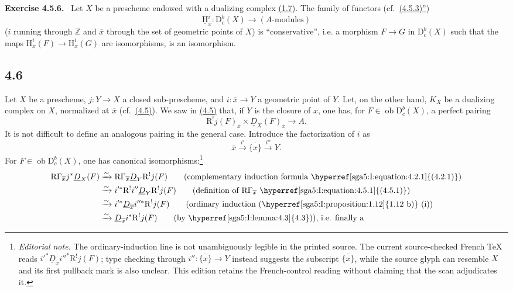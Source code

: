 \documentclass[11pt]{article}
\newenvironment{statement}[1]{\par\medskip\noindent\textbf{#1.}\ }{\par\medskip}
\renewcommand{\H}{\mathrm{H}}
\newcommand{\R}{\mathrm{R}}
\newcommand{\D}{\mathrm{D}}
\newcommand{\Z}{\mathbb{Z}}
\newcommand{\ob}{\operatorname{ob}}
\newcommand{\ol}[1]{\overline{#1}}
\providecommand{\ob}{\operatorname{ob}}
\providecommand{\R}{\mathrm R}
\providecommand{\Z}{\mathbb Z}
\begin{document}
\label{sga5:I:exercise:4.5.6}\begin{statement}{Exercise 4.5.6}
Let $X$ be a prescheme endowed with a dualizing complex \hyperref[sga5:I:definition:1.7]{(1.7)}. The family of functors (cf.~\hyperref[sga5:I:equation:4.5.3:3]{(4.5.3)''})
\[
\underline{\H}_{\ol{x}}^i:\D_c^b(X)\longrightarrow (A\text{-modules})
\]
($i$ running through $\Z$ and $\ol{x}$ through the set of geometric points of $X$) is ``conservative'', i.e. a morphism $F\to G$ in $\D_c^b(X)$ such that the maps $\H_{\ol{x}}^i(F)\to\H_{\ol{x}}^i(G)$ are isomorphisms, is an isomorphism.
\end{statement}

\subsection*{4.6}\label{sga5:I:subsection:4.6}
Let $X$ be a prescheme, $j:Y\to X$ a closed sub-prescheme, and $i:\ol{x}\to Y$ a geometric point of $Y$. Let, on the other hand, $K_X$ be a dualizing complex on $X$, normalized at $\ol{x}$ (cf.~\hyperref[sga5:I:subsection:4.5]{(4.5)}). We saw in \hyperref[sga5:I:subsection:4.5]{(4.5)} that, if $Y$ is the closure of $x$, one has, for $F\in\ob\D_c^b(X)$, a perfect pairing
\[
\R^{!}j(F)_{\ol{x}}\times \underline{D}_X(F)_{\ol{x}}\longrightarrow A.
\]
It is not difficult to define an analogous pairing in the general case. Introduce the factorization of $i$ as
\[
\ol{x}\xrightarrow{i'}\ol{\{x\}}\xrightarrow{i''}Y.
\]
For $F\in\ob\D_c^b(X)$, one has canonical isomorphisms:\footnote{\emph{Editorial note.} The ordinary-induction line is not unambiguously legible in the printed source. The current source-checked French TeX reads $i'^*\underline D_{\ol{x}}i''^*\R^!j(F)$; type checking through $i'':\ol{\{x\}}\to Y$ instead suggests the subscript $\ol{\{x\}}$, while the source glyph can resemble $X$ and its first pullback mark is also unclear. This edition retains the French-control reading without claiming that the scan adjudicates it.}
\[
\begin{aligned}
\R\Gamma_{\ol{x}}j^*\underline{D}_X(F)&\xrightarrow{\sim}\R\Gamma_{\ol{x}}\underline{D}_Y\R^{!}j(F)\qquad\text{(complementary induction formula \hyperref[sga5:I:equation:4.2.1]{(4.2.1)})}\\
&\xrightarrow{\sim}i'^*\R^{!}i''\underline{D}_Y\R^{!}j(F)\qquad\text{(definition of $\R\Gamma_{\ol{x}}$ \hyperref[sga5:I:equation:4.5.1]{(4.5.1)})}\\
&\xrightarrow{\sim}i'^*\underline{D}_{\ol{x}}i''^*\R^{!}j(F)\qquad\text{(ordinary induction (\hyperref[sga5:I:proposition:1.12]{1.12 b)} (i))}\\
&\xrightarrow{\sim}\underline{D}_{\ol{x}}i^*\R^{!}j(F)\qquad\text{(by \hyperref[sga5:I:lemma:4.3]{4.3})), i.e. finally a}
\end{aligned}
\]
\end{document}
